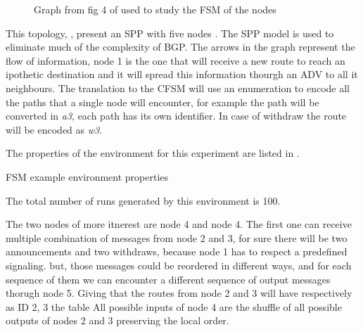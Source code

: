 \begin{figure}[h]                                                               
    \begin{center}                                                              
        
    \end{center}                                                                
	\caption{Graph from fig 4 of \cite{griffinFSM} used to study the \ac{FSM}
		of the nodes}                                
    \label{fig:griffin_fig_4}                                                   
\end{figure}

This topology, , present an \ac{SPP} with five nodes \cite{griffin2002stable}. 
The \ac{SPP} model is used to eliminate much of the complexity of \ac{BGP}.
The arrows in the graph represent the flow of information, node \num{1} is the one
that will receive a new route to reach an ipothetic destination and it will 
spread this information thourgh an \ac{ADV} to all it neighbours.
The translation to the \ac{CFSM} will use an enumeration to encode all the
paths that a single node will encounter, for example the path  will
be converted in \textit{a3}, each path has its own identifier.
In case of withdraw the route will be encoded as \textit{w3}.

The properties of the environment for this experiment are listed in .

\begin{table}[h]
	
	\caption{FSM example environment properties}
	\label{tbl:fig_4_example}
\end{table}

The total number of runs generated by this environment is \num{100}.

The two nodes of more itnerest are node \num{4} and node \num{4}.
The first one can receive multiple combination of messages from node \num{2} and
\num{3}, for sure there will be two announcements and two withdraws, because node
1 has to respect a predefined signaling. but, those messages could be reordered
in different ways, and for each sequence of them we can encounter a different
sequence of output messages thorugh node \num{5}.
Giving that the routes from node \num{2} and \num{3} will have respectively as 
ID \num{2}, \num{3} the table 
All possible inputs of node \num{4} are the shuffle of all possible
outputs of nodes \num{2} and \num{3} preserving the local order.

